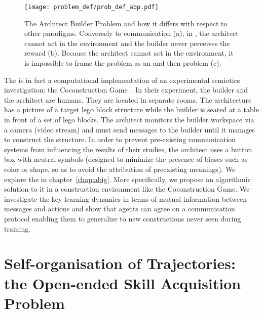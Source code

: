 \begin{figure}[!h]
    \centering
    \texttt{[image: problem\_def/prob\_def\_abp.pdf]}
    \caption{The Architect Builder Problem and how it differs with respect to other \ai paradigms. Conversely to \marl communication (a), in \abp, the architect cannot act in the environment and the builder never perceives the reward (b). Because the architect cannot act in the environment, it is impossible to frame the problem as an \rl and then \irl problem (c).}
    \label{fig:prob_def_abp}
\end{figure}

The \abp is in fact a computational implementation of an experimental semiotics investigation: the Coconstruction Game~\citep{vollmer2014studying}. In their experiment, the builder and the architect are humans. They are located in separate rooms. The architecture has a picture of a target lego block structure while the builder is seated at a table in front of a set of lego blocks. The architect monitors the builder workspace via a camera (video stream) and must send messages to the builder until it manages to construct the structure. In order to prevent pre-existing communication systems from influencing the results of their studies, the architect uses a button box with neutral symbols (designed to minimize the presence of biases such as color or shape, so as to avoid the attribution of preexisting meanings).
We explore the \abp in chapter~\ref{chap:abig}. More specifically, we propose an algorithmic solution to it in a construction environment like the Coconstruction Game. We investigate the key learning dynamics in terms of mutual information between messages and actions and show that agents can agree on a communication protocol enabling them to generalize to new constructions never seen during training.


\newpage

\section{Self-organisation of Trajectories: the Open-ended Skill Acquisition Problem}
\label{sec:self-orga-traj}
%

